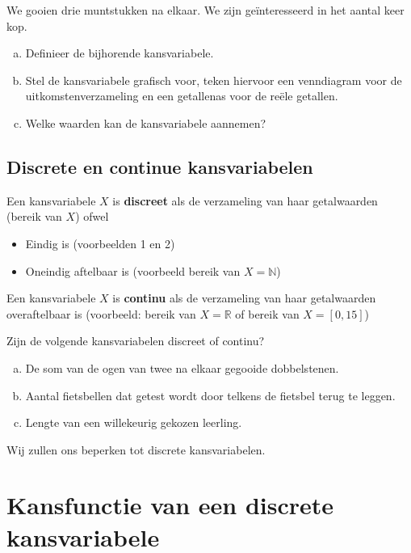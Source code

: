 \documentclass[a4paper,12pt, twoside]{article}
\begin{document}
\begin{oefening}
We gooien drie muntstukken na elkaar. We zijn geïnteresseerd in het aantal keer kop.
\begin{enumerate}[(a)]
  \item Definieer de bijhorende kansvariabele.
  \item Stel de kansvariabele grafisch voor, teken hiervoor een venndiagram voor de uitkomstenverzameling en een getallenas voor de reële getallen.
  \item Welke waarden kan de kansvariabele aannemen?
\end{enumerate}
\end{oefening}

\subsection{Discrete en continue kansvariabelen}

Een kansvariabele $X$ is {\bf discreet} als de verzameling van haar getalwaarden (bereik van $X$) ofwel
\begin{itemize}
  \item Eindig is (voorbeelden 1 en 2)
  \item Oneindig aftelbaar is (voorbeeld bereik van $X=\mathbb{N}$)
\end{itemize}

Een kansvariabele $X$ is {\bf continu} als de verzameling van haar getalwaarden overaftelbaar is (voorbeeld: bereik van $X = \mathbb{R}$ of bereik van $X = [0,15]$)

\begin{oefening}
Zijn de volgende kansvariabelen discreet of continu?
\begin{enumerate}[(a)]
  \item De som van de ogen van twee na elkaar gegooide dobbelstenen.
  \item Aantal fietsbellen dat getest wordt door telkens de fietsbel terug te leggen.
  \item Lengte van een willekeurig gekozen leerling.
\end{enumerate}
\end{oefening}

{\scriptsize Wij zullen ons beperken tot discrete kansvariabelen.}
\vspace*{-1cm}

\cleardoublepage
\section{Kansfunctie van een discrete kansvariabele}
\end{document}
